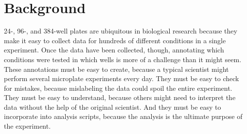 \documentclass[twocolumn]{bmcart}
\begin{document}

\section*{Background}

24-, 96-, and 384-well plates are ubiquitous in biological research because
they make it easy to collect data for hundreds of different conditions in a
single experiment. Once the data have been collected, though, annotating which
conditions were tested in which wells is more of a challenge than it might
seem. These annotations must be easy to create, because a typical scientist
might perform several microplate experiments every day. They must be easy to
check for mistakes, because mislabeling the data could spoil the entire
experiment. They must be easy to understand, because others might need to
interpret the data without the help of the original scientist. And they must be
easy to incorporate into analysis scripts, because the analysis is the ultimate
purpose of the experiment.
\end{document}
